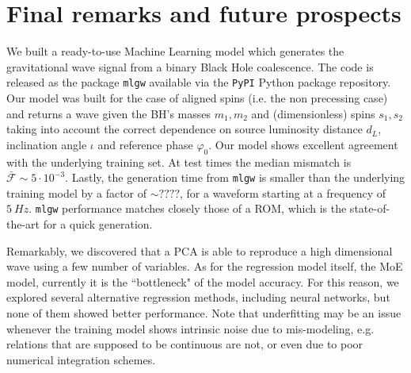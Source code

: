 


\section{Final remarks and future prospects}
We built a ready-to-use Machine Learning model which generates the gravitational wave signal from a binary Black Hole coalescence. The code is released as the package \texttt{mlgw} available via the \texttt{PyPI} Python package repository. 
Our model was built for the case of aligned spins (i.e. the non precessing case) and returns a wave given the BH's masses $m_1, m_2$ and (dimensionless) spins $s_1, s_2$ taking into account the correct dependence on source luminosity distance $d_L$, inclination angle $\iota$ and reference phase $\varphi_0$.
Our model shows excellent agreement with the underlying training set. At test times the median mismatch is $\bar{\mathcal{F}}\sim 5 \cdot 10^{-3}$. Lastly, the generation time from \texttt{mlgw} is smaller than the underlying training model by a factor of $\sim ????$, for a waveform starting at a frequency of $\SI{5}{Hz}$.
\texttt{mlgw} performance matches closely those of a ROM, which is the state-of-the-art for a quick generation.
\par
Remarkably, we discovered that a PCA is able to reproduce a high dimensional wave using a few number of variables. As for the regression model itself, the MoE model, currently it is the ``bottleneck" of the model accuracy. For this reason, we explored several alternative regression methods, including neural networks, but none of them showed better performance.
Note that underfitting may be an issue whenever the training model shows intrinsic noise due to mis-modeling, e.g. relations that are supposed to be continuous are not, or even due to poor numerical integration schemes.
